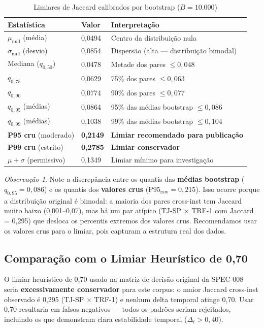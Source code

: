 \documentclass[12pt,a4paper]{article}
\theoremstyle{remark}
\newtheorem{obs}{Observação}[section]
\begin{document}
\begin{table}[H]\centering\footnotesize
\caption{Limiares de Jaccard calibrados por bootstrap ($B = 10.000$)}
\label{tab:bootstrap}
\begin{tabular}{p{}p{}p{}}
\toprule
\textbf{Estatística} & \textbf{Valor} & \textbf{Interpretação} \\
\midrule
$\mu_{\text{null}}$ (média) & 0,0494 & Centro da distribuição nula \\
$\sigma_{\text{null}}$ (desvio) & 0,0854 & Dispersão (alta — distribuição bimodal) \\
Mediana ($q_{0,50}$) & 0,0478 & Metade dos pares $\leq 0,048$ \\
$q_{0,75}$ & 0,0629 & 75\% dos pares $\leq 0,063$ \\
$q_{0,90}$ & 0,0774 & 90\% dos pares $\leq 0,077$ \\
$q_{0,95}$ (médias) & 0,0864 & 95\% das médias bootstrap $\leq 0,086$ \\
$q_{0,99}$ (médias) & 0,1038 & 99\% das médias bootstrap $\leq 0,104$ \\
\midrule
\textbf{P95 cru} (moderado) & \textbf{0,2149} & \textbf{Limiar recomendado para publicação} \\
\textbf{P99 cru} (estrito) & \textbf{0,2785} & \textbf{Limiar conservador} \\
$\mu + \sigma$ (permissivo) & 0,1349 & Limiar mínimo para investigação \\
\bottomrule
\end{tabular}
\end{table}

\begin{obs}
Note a discrepância entre os quantis das \textbf{médias bootstrap} ($q_{0,95} = 0,086$) e os quantis dos \textbf{valores crus} ($\text{P95}_{\text{raw}} = 0,215$). Isso ocorre porque a distribuição original é bimodal: a maioria dos pares cross-inst tem Jaccard muito baixo (0,001--0,07), mas há um par atípico (TJ-SP $\times$ TRF-1 com Jaccard = 0,295) que desloca os percentis extremos dos valores crus. Recomendamos usar os valores crus para o limiar, pois capturam a estrutura real dos dados.
\end{obs}

\subsection{Comparação com o Limiar Heurístico de 0,70}

O limiar heurístico de 0,70 usado na matriz de decisão original da SPEC-008 seria \textbf{excessivamente conservador} para este corpus: o maior Jaccard cross-inst observado é 0,295 (TJ-SP $\times$ TRF-1) e nenhum delta temporal atinge 0,70. Usar 0,70 resultaria em falsos negativos — todos os padrões seriam rejeitados, incluindo os que demonstram clara estabilidade temporal ($\Delta_t > 0,40$).
\end{document}
